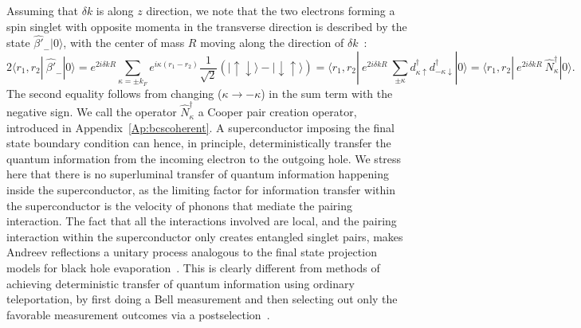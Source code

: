 \documentclass[10pt,letterpaper,aps,onecolumn,superscriptaddress,floatfix,notitlepage]{revtex4-1}
\begin{document}
	Assuming that $\delta k$ is along $z$ direction, we note that the two electrons forming a spin singlet with opposite momenta in the transverse direction is described by the state $\hat{\beta'}_{-}|0\rangle$, with the center of mass $R$ moving along the direction of $\delta k$~\cite{spintron}:
	\begin{equation}
	\label{singlet}
	2\langle r_{1}, r_{2}|~\hat{\beta'}_{-}|0\rangle =e^{2i\delta k R}\sum\limits_{\kappa=\pm k_{F}}e^{i\kappa(r_{1}-r_{2})}\frac{1}{\sqrt{2}}(|\uparrow\downarrow\rangle-|\downarrow\uparrow\rangle)=\langle r_{1}, r_{2}|~e^{2i\delta k R}~	\sum\limits_{\pm\kappa}d_{\kappa\uparrow}^{\dagger}d_{-\kappa\downarrow}^{\dagger}|0\rangle = \langle r_{1}, r_{2}|~e^{2i\delta k R}~\hat{N}_{\kappa}^{\dagger}|0\rangle.\end{equation}The second equality follows from changing ($\kappa\rightarrow-\kappa$) in the sum term with the negative sign. We call the operator $\hat{N}_{\kappa}^{\dagger}$ a Cooper pair creation operator, introduced in Appendix~\ref{Ap:bcscoherent}. A superconductor imposing the final state boundary condition can hence, in principle, deterministically transfer the quantum information from the incoming electron to the outgoing hole. We stress here that there is no superluminal transfer of quantum information happening inside the superconductor, as the limiting factor for information transfer within the superconductor is the velocity of phonons that mediate the pairing interaction. The fact that all the interactions involved are local, and the pairing interaction within the superconductor only creates entangled singlet pairs, makes Andreev reflections a unitary process analogous to the final state projection models for black hole evaporation~\cite{projection,horowitz}. This is clearly different from methods of achieving deterministic transfer of quantum information using ordinary teleportation, by first doing a Bell measurement and then selecting out only the favorable measurement outcomes via a postselection~\cite{lloyd2011closed}. 
	
\end{document}
